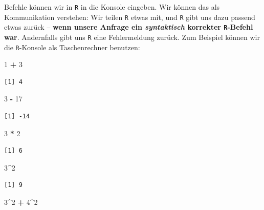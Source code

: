 \documentclass[12pt,]{tufte-book}
\newenvironment{Shaded}{\begin{snugshade}}{\end{snugshade}}
\newcommand{\DecValTok}[1]{\textcolor[rgb]{0.00,0.00,0.81}{#1}}
\newcommand{\StringTok}[1]{\textcolor[rgb]{0.31,0.60,0.02}{#1}}
\newcommand{\OperatorTok}[1]{\textcolor[rgb]{0.81,0.36,0.00}{\textbf{#1}}}
\theoremstyle{definition}
\theoremstyle{definition}
\theoremstyle{definition}
\theoremstyle{remark}
\begin{document}
Befehle können wir in \texttt{R} in die Konsole eingeben. Wir können das
als Kommunikation verstehen: Wir teilen \texttt{R} etwas mit, und
\texttt{R} gibt uns dazu passend etwas zurück -- \textbf{wenn unsere
Anfrage ein \emph{syntaktisch} korrekter \texttt{R}-Befehl war}.
Andernfalls gibt uns \texttt{R} eine Fehlermeldung zurück. Zum Beispiel
können wir die \texttt{R}-Konsole als Taschenrechner benutzen:

\begin{Shaded}
\begin{Highlighting}[]
\DecValTok{1} \OperatorTok{+}\StringTok{ }\DecValTok{3}
\end{Highlighting}
\end{Shaded}

\begin{verbatim}
[1] 4
\end{verbatim}

\begin{Shaded}
\begin{Highlighting}[]
\DecValTok{3} \OperatorTok{-}\StringTok{ }\DecValTok{17}
\end{Highlighting}
\end{Shaded}

\begin{verbatim}
[1] -14
\end{verbatim}

\begin{Shaded}
\begin{Highlighting}[]
\DecValTok{3} \OperatorTok{*}\StringTok{ }\DecValTok{2}
\end{Highlighting}
\end{Shaded}

\begin{verbatim}
[1] 6
\end{verbatim}

\begin{Shaded}
\begin{Highlighting}[]
\DecValTok{3}\OperatorTok{^}\DecValTok{2}
\end{Highlighting}
\end{Shaded}

\begin{verbatim}
[1] 9
\end{verbatim}

\begin{Shaded}
\begin{Highlighting}[]
\DecValTok{3}\OperatorTok{^}\DecValTok{2} \OperatorTok{+}\StringTok{ }\DecValTok{4}\OperatorTok{^}\DecValTok{2}
\end{Highlighting}
\end{Shaded}
\end{document}
